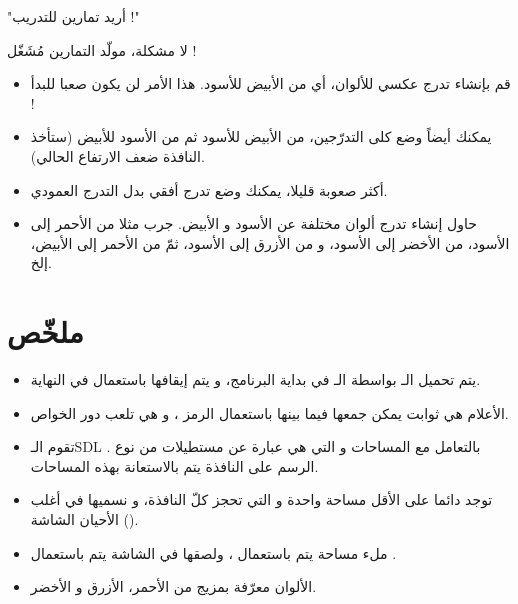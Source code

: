 {\large"أريد تمارين للتدريب !"}

لا مشكلة، مولّد التمارين مُشَغّل !

\begin{itemize}
	\item قم بإنشاء تدرج عكسي للألوان، أي من الأبيض للأسود. هذا الأمر لن يكون صعبا للبدأ !
	\item يمكنك أيضاً وضع كلى التدرّجين، من الأبيض للأسود ثم من الأسود للأبيض (ستأخذ النافذة ضعف الارتفاع الحالي).
	\item أكثر صعوبة قليلا، يمكنك وضع تدرج أفقي بدل التدرج العمودي.
	\item حاول إنشاء تدرج ألوان مختلفة عن الأسود و الأبيض. جرب مثلا من الأحمر إلى الأسود، من الأخضر إلى الأسود، و من الأزرق إلى الأسود، ثمّ من الأحمر إلى الأبيض، إلخ.
\end{itemize}

\section*{ملخّص}

\begin{itemize}
	\item يتم تحميل الـ
	بواسطة الـ
	في بداية البرنامج، و يتم إيقافها باستعمال
	في النهاية.
	\item الأعلام هي ثوابت يمكن جمعها فيما بينها باستعمال الرمز 
	\InlineCode{|}،
	 و هي تلعب دور الخواص.
	\item تقوم الـ\textenglish{SDL}
	بالتعامل مع المساحات و التي هي عبارة عن مستطيلات من نوع 
	.
	الرسم على النافذة يتم بالاستعانة بهذه المساحات.
	\item توجد دائما على الأقل مساحة واحدة و التي تحجز كلّ النافذة، و نسميها في أغلب الأحيان الشاشة 
	().
	\item ملء مساحة يتم باستعمال
	،
	ولصقها في الشاشة يتم باستعمال
	.
	\item الألوان معرّفة بمزيج من الأحمر، الأزرق و الأخضر.	
\end{itemize}
